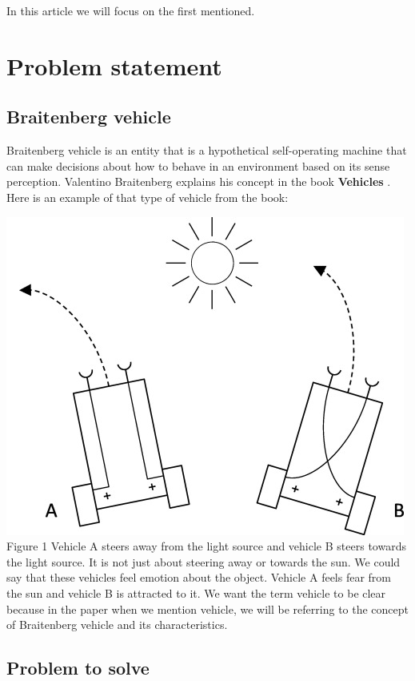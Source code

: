 \documentclass[10pt,twoside,english,a4paper]{article}
\begin{document}
In this article we will focus on the first mentioned. 

\section{Problem statement} \label{problem}

\subsection{Braitenberg vehicle} \label{braitenberg}

Braitenberg vehicle is an entity that is a hypothetical self-operating machine that can make decisions about how to behave in an environment based on its sense perception. Valentino Braitenberg explains his concept in the book \textbf{Vehicles} \cite{Braitenberg}. Here is an example of that type of vehicle from the book:

\bigbreak

\includegraphics[scale=0.45]{braitenberg.jpg}
\quad Figure 1
\bigbreak
Vehicle A steers away from the light source and vehicle B steers towards the light source. It is not just about steering away or towards the sun. We could say that these vehicles feel emotion about the object. Vehicle A feels fear from the sun and vehicle B is attracted to it. We want the term vehicle to be clear because in the paper when we mention vehicle, we will be referring to the concept of Braitenberg vehicle and its characteristics. 

\subsection{Problem to solve} \label{problem to solve}
\end{document}
